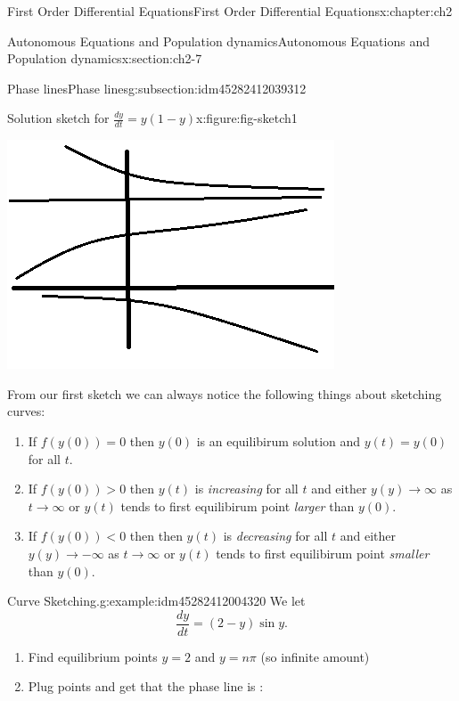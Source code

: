 \documentclass[oneside,10pt,]{book}
\numberwithin{equation}{section}
\numberwithin{equation}{section}
\newcommand{\lt}{<}
\begin{document}
\begin{chapterptx}{First Order Differential Equations}{}{First Order Differential Equations}{}{}{x:chapter:ch2}
\begin{sectionptx}{Autonomous Equations and Population dynamics}{}{Autonomous Equations and Population dynamics}{}{}{x:section:ch2-7}
\begin{subsectionptx}{Phase lines}{}{Phase lines}{}{}{g:subsection:idm45282412039312}
\begin{figureptx}{Solution sketch for \(\frac{dy}{dt} = y(1-y)\)}{x:figure:fig-sketch1}{}
\begin{image}{0.3}{0.4}{0.3}
\includegraphics[width=\linewidth]{images/1.6-Sketch1.png}
\end{image}%
\tcblower
\end{figureptx}%
%
\par
From our first sketch we can always notice the following things about sketching curves:%
%
\begin{enumerate}
\item{}If \(f(y(0))=0\) then \(y(0)\) is an equilibirum solution and \(y(t)=y(0)\) for all \(t\).%
\item{}If \(f(y(0))>0\) then \(y(t)\) is \emph{increasing} for all \(t\) and either \(y(y)\to\infty\) as \(t\to\infty\) or \(y(t)\) tends to first equilibirum point \emph{larger} than \(y(0).\)%
\item{}If \(f(y(0))
\lt 0\) then then \(y(t)\) is \emph{decreasing} for all \(t\) and either \(y(y)\to-\infty\) as \(t\to\infty\) or \(y(t)\) tends to first equilibirum point \emph{smaller} than \(y(0).\)%
\end{enumerate}
\begin{example}{Curve Sketching.}{g:example:idm45282412004320}%
We let%
\begin{equation*}
\frac{dy}{dt}=(2-y)\sin y.
\end{equation*}
%
%
\begin{enumerate}
\item{}Find equilibrium points \(y=2\) and \(y=n\pi\) (so infinite amount)%
\item{}Plug points and get that the phase line is : \begin{image}{0.35}{0.3}{0.35}%

\end{image}
\end{enumerate}
\end{example}
\end{subsectionptx}
\end{sectionptx}
\end{chapterptx}
\end{document}
